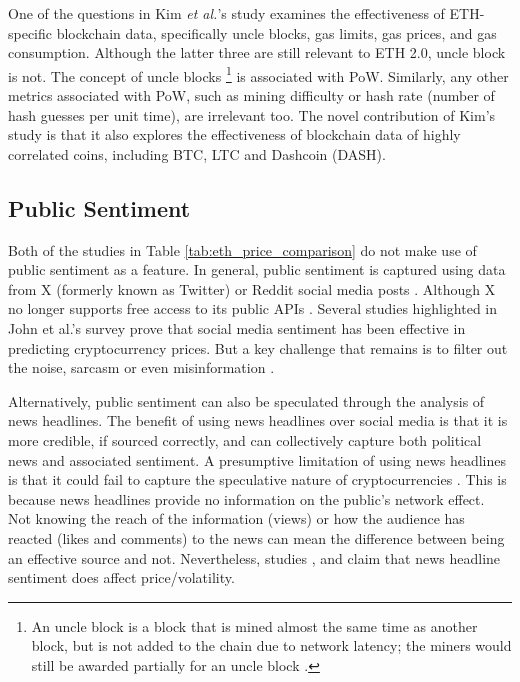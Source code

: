 \documentclass[ %
                    author={Raj Dhakan},
                supervisor={Dr. Ayush Joshi},
                    degree={MSc},
                     title={Ethereum Price Prediction using Internal and External Factors},
                  subtitle={},
                      type={},
                      year={2025}]{dissertation}
\begin{document}
One of the questions in Kim \textit{et al.}'s \cite{RN141} study examines the effectiveness of ETH-specific blockchain data, specifically uncle blocks, gas limits, gas prices, and gas consumption. Although the latter three are still relevant to ETH 2.0, uncle block is not. The concept of uncle blocks \footnote{An uncle block is a block that is mined almost the same time as another block, but is not added to the chain due to network latency; the miners would still be awarded partially for an uncle block \cite{RN141}.} is associated with PoW. Similarly, any other metrics associated with PoW, such as mining difficulty or hash rate (number of hash guesses per unit time), are irrelevant too. The novel contribution of Kim's study is that it also explores the effectiveness of blockchain data of highly correlated coins, including BTC, LTC and Dashcoin (DASH).

\subsection{Public Sentiment}
\label{sec:public_sentiment}

Both of the studies in Table \ref{tab:eth_price_comparison} do not make use of public sentiment as a feature. In general, public sentiment is captured using data from X (formerly known as Twitter) or Reddit social media posts \cite{john2024cryptocurrency}. Although X no longer supports free access to its public APIs \cite{john2024cryptocurrency}. Several studies highlighted in John et al.'s \cite{john2024cryptocurrency} survey prove that social media sentiment has been effective in predicting cryptocurrency prices. But a key challenge that remains is to filter out the noise, sarcasm or even misinformation \cite{john2024cryptocurrency}.

Alternatively, public sentiment can also be speculated through the analysis of news headlines. The benefit of using news headlines over social media is that it is more credible, if sourced correctly, and can collectively capture both political news and associated sentiment. A presumptive limitation of using news headlines is that it could fail to capture the speculative nature of cryptocurrencies \cite{john2024cryptocurrency}. This is because news headlines provide no information on the public's network effect. Not knowing the reach of the information (views) or how the audience has reacted (likes and comments) to the news can mean the difference between being an effective source and not. Nevertheless, studies \cite{anamika2022news}, \cite{RN146} and \cite{bhatnagar2023demystifying} claim that news headline sentiment does affect price/volatility.
\end{document}
